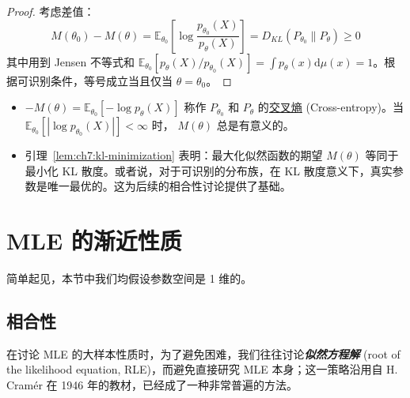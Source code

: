 \begin{proof}

考虑差值：
\[M(\theta_0) -M(\theta)= \mathbb{E}_{\theta_0} \left[ \log \frac{p_{\theta_0}(X)}{p_{\theta}(X)} \right] =D_{KL}(P_{\theta_0}\|P_\theta) \ge 0\]
其中用到 Jensen 不等式和 $\mathbb{E}_{\theta_0}[p_\theta(X)/p_{\theta_0}(X)] = \int p_\theta(x) \mathrm d\mu(x)= 1$。根据可识别条件，等号成立当且仅当 $\theta = \theta_0$。

\end{proof}

\begin{remark}

\begin{itemize}
\tightlist
\item
  $-M(\theta)=\mathbb{E}_{\theta_0}[-\log p_{\theta}(X)]$ 称作 $P_{\theta_0}$ 和 $P_\theta$ 的\href{https://en.wikipedia.org/wiki/Cross-entropy}{交叉熵} (Cross-entropy)。当 $\mathbb{E}_{\theta_0}[|\log p_{\theta_0}(X)|]<\infty$ 时， $M(\theta)$ 总是有意义的。
\item
  引理~\ref{lem:ch7:kl-minimization} 表明：最大化似然函数的期望 $M(\theta)$ 等同于最小化 KL 散度。或者说，对于可识别的分布族，在 KL 散度意义下，真实参数是唯一最优的。这为后续的相合性讨论提供了基础。
\end{itemize}
\end{remark}

\section{MLE 的渐近性质}

简单起见，本节中我们均假设参数空间是 1 维的。

\subsection{相合性}

在讨论 MLE 的大样本性质时，为了避免困难，我们往往讨论\textbf{\emph{似然方程解}} (root of the likelihood equation, RLE)，而避免直接研究 MLE 本身；这一策略沿用自 H. Cramér 在 1946 年的教材，已经成了一种非常普遍的方法。

